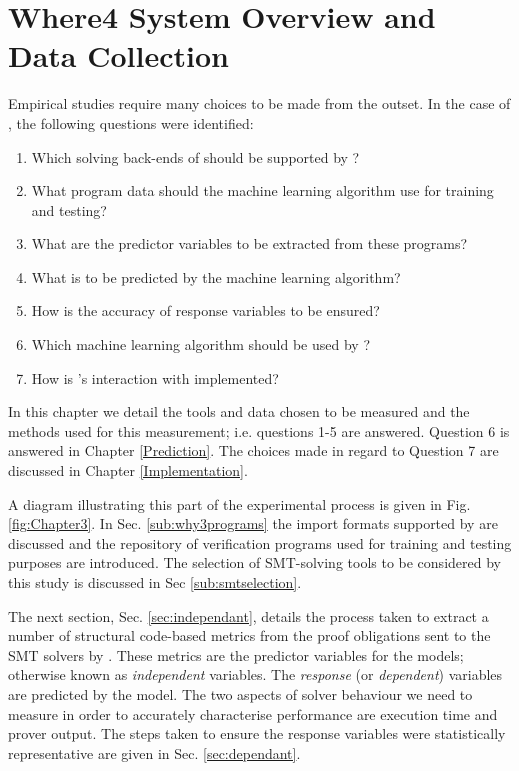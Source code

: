 \chapter{Where4 System Overview and Data Collection}%
\thispagestyle{nohead}
\label{Experimental} %

Empirical studies require many choices to be made from the outset. In the case of \where, the following questions were identified:

\begin{enumerate}
	\item Which solving back-ends of \why should be supported by \where?
	\item What program data should the machine learning algorithm use for training and testing?
	\item What are the predictor variables to be extracted from these programs?
	\item What is to be predicted by the machine learning algorithm?
	\item How is the accuracy of response variables to be ensured?
	\item Which machine learning algorithm should be used by \where?
	\item How is \where's interaction with \why implemented?   
\end{enumerate}   

In this chapter we detail the tools and data chosen to be measured and the methods used for this measurement; i.e. questions 1-5 are answered. Question 6 is answered in Chapter \ref{Prediction}. The choices made in regard to Question 7 are discussed in Chapter \ref{Implementation}. 

A diagram illustrating this part of the experimental process is given in Fig. \ref{fig:Chapter3}. In Sec. \ref{sub:why3programs} the import formats supported by \why are discussed and the repository of verification programs used for training and testing purposes are introduced. The selection of SMT-solving tools to be considered by this study is discussed in Sec \ref{sub:smtselection}.  

The next section, Sec. \ref{sec:independant}, details the process taken to extract a number of structural code-based metrics from the proof obligations sent to the SMT solvers by \why. These metrics are the predictor variables for the \where models; otherwise known as \textit{independent} variables. The \textit{response} (or \textit{dependent}) variables are predicted by the model. The two aspects of solver behaviour we need to measure in order to accurately characterise performance are execution time and prover output. The steps taken to ensure the response variables were statistically representative are given in Sec. \ref{sec:dependant}. 

